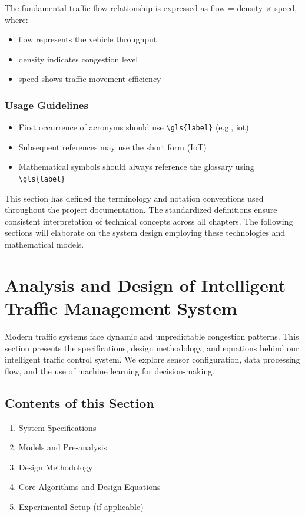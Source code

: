 \documentclass[12pt]{report}
\begin{document}
The fundamental traffic flow relationship is expressed as \gls{flow} = \gls{density} × \gls{speed}, where:
\begin{itemize}
    \item \gls{flow} represents the vehicle throughput
    \item \gls{density} indicates congestion level
    \item \gls{speed} shows traffic movement efficiency
\end{itemize}

\subsection{Usage Guidelines}
\begin{itemize}
    \item First occurrence of acronyms should use \verb|\gls{label}| (e.g., \gls{iot})
    \item Subsequent references may use the short form (IoT)
    \item Mathematical symbols should always reference the glossary using \verb|\gls{label}|
\end{itemize}

This section has defined the terminology and notation conventions used throughout the project documentation. The standardized definitions ensure consistent interpretation of technical concepts across all chapters. The following sections will elaborate on the system design employing these technologies and mathematical models.

\chapter{Analysis and Design of Intelligent Traffic Management System}
Modern traffic systems face dynamic and unpredictable congestion patterns. This section presents the specifications, design methodology, and equations behind our intelligent traffic control system. We explore sensor configuration, data processing flow, and the use of machine learning for decision-making.

\section{Contents of this Section}
\begin{enumerate}
\item System Specifications
\item Models and Pre-analysis
\item Design Methodology
\item Core Algorithms and Design Equations
\item Experimental Setup (if applicable)
\end{enumerate}
\end{document}
